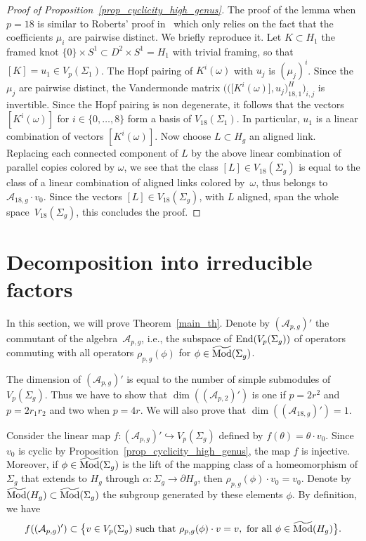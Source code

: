 \documentclass[pdftex]{sigma}
\numberwithin{equation}{section}
\begin{document}
\begin{proof}[Proof of Proposition~\ref{prop_cyclicity_high_genus}]
The proof of the lemma when $p=18$ is similar to Roberts' proof in~\cite{Ro} which only relies on the fact that the coefficients $\mu_i$ are pairwise distinct. We briefly reproduce it. Let $K\subset H_1$ the framed knot $\{0\}\times S^1 \subset D^2\times S^1=H_1$ with trivial framing, so that $[K]=u_1\in V_p(\Sigma_1)$. The Hopf pairing of $K^i(\omega)$ with $u_j$ is $(\mu_j)^i$. Since the $\mu_j$ are pairwise distinct, the Vandermonde matrix $\big(\big( \big[K^i(\omega)\big], u_j \big)_{18, 1}^H\big)_{i,j}$ is invertible. Since the Hopf pairing is non degenerate, it follows that the vectors $[K^i (\omega)]$ for $i\in \{0, \ldots, 8 \}$ form a basis of $V_{18}(\Sigma_1)$. In particular, $u_1$ is a linear combination of vectors $[K^i(\omega)]$. Now choose $L\subset H_g$ an aligned link. Replacing each connected component of $L$ by the above linear combination of parallel copies colored by $\omega$, we see that the class $[L]\in V_{18}(\Sigma_g)$ is equal to the class of a linear combination of aligned links colored by~$\omega$, thus belongs to $\mathcal{A}_{18,g}\cdot v_0$. Since the vectors $[L]\in V_{18}(\Sigma_g)$, with $L$ aligned, span the whole space~$V_{18}(\Sigma_g)$, this concludes the proof.
\end{proof}

\section{Decomposition into irreducible factors}

 In this section, we will prove Theorem~\ref{main_th}. Denote by $(\mathcal{A}_{p,g})'$ the commutant of the algebra~$\mathcal{A}_{p,g}$, i.e., the subspace of $\operatorname{End}(V_p(\Sigma_g))$ of operators commuting with all operators $\rho_{p,g}(\phi)$ for $\phi\in \widetilde{\operatorname{Mod}}(\Sigma_g)$.

The dimension of $(\mathcal{A}_{p,g})'$ is equal to the number of simple submodules of $V_p(\Sigma_g)$. Thus we have to show that $\dim( (\mathcal{A}_{p,2})')$ is one if $p=2r^2$ and $p=2r_1r_2$ and two when $p=4r$. We will also prove that $\dim( (\mathcal{A}_{18,g})')=1$.

Consider the linear map $f\colon (\mathcal{A}_{p,g})' \hookrightarrow V_p(\Sigma_g)$ defined by $f(\theta)= \theta\cdot v_0$. Since $v_0$ is cyclic by Proposition~\ref{prop_cyclicity_high_genus}, the map $f$ is injective. Moreover, if $\phi \in \widetilde{\operatorname{Mod}}(\Sigma_g)$ is the lift of the mapping class of a homeomorphism of $\Sigma_g$ that extends to $H_g$ through $\alpha \colon \Sigma_g \rightarrow \partial H_g$, then $ \rho_{p,g}(\phi)\cdot v_0 = v_0$. Denote by $\widetilde{\operatorname{Mod}}(H_g)\subset \widetilde{\operatorname{Mod}}(\Sigma_g)$ the subgroup generated by these elements $\phi$. By definition, we have
\begin{gather*} f ( (\mathcal{A}_{p,g})' ) \subset \big\{ v\in V_p(\Sigma_g) \mbox{ such that } \rho_{p,g}(\phi)\cdot v = v, \mbox{ for all }\phi\in \widetilde{\operatorname{Mod}}(H_g) \big\}.\end{gather*}
\end{document}
